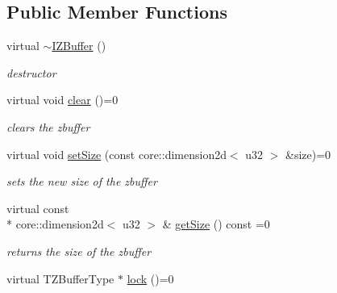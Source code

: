\subsection*{Public Member Functions}
\begin{DoxyCompactItemize}
\item 
\hypertarget{classirr_1_1video_1_1_i_z_buffer_a8fa5691c16e71b7e1fd1babe30f40d32}{virtual \hyperlink{classirr_1_1video_1_1_i_z_buffer_a8fa5691c16e71b7e1fd1babe30f40d32}{$\sim$\-I\-Z\-Buffer} ()}\label{classirr_1_1video_1_1_i_z_buffer_a8fa5691c16e71b7e1fd1babe30f40d32}

\begin{DoxyCompactList}\small\item\em destructor \end{DoxyCompactList}\item 
\hypertarget{classirr_1_1video_1_1_i_z_buffer_a9bba03b0f25ac2cfe065d111cd7d63f2}{virtual void \hyperlink{classirr_1_1video_1_1_i_z_buffer_a9bba03b0f25ac2cfe065d111cd7d63f2}{clear} ()=0}\label{classirr_1_1video_1_1_i_z_buffer_a9bba03b0f25ac2cfe065d111cd7d63f2}

\begin{DoxyCompactList}\small\item\em clears the zbuffer \end{DoxyCompactList}\item 
\hypertarget{classirr_1_1video_1_1_i_z_buffer_abb45884214a4c41fc129f248c2c6371c}{virtual void \hyperlink{classirr_1_1video_1_1_i_z_buffer_abb45884214a4c41fc129f248c2c6371c}{set\-Size} (const core\-::dimension2d$<$ u32 $>$ \&size)=0}\label{classirr_1_1video_1_1_i_z_buffer_abb45884214a4c41fc129f248c2c6371c}

\begin{DoxyCompactList}\small\item\em sets the new size of the zbuffer \end{DoxyCompactList}\item 
\hypertarget{classirr_1_1video_1_1_i_z_buffer_a5ff13425212cefff78c27149f62e9666}{virtual const \\*
core\-::dimension2d$<$ u32 $>$ \& \hyperlink{classirr_1_1video_1_1_i_z_buffer_a5ff13425212cefff78c27149f62e9666}{get\-Size} () const =0}\label{classirr_1_1video_1_1_i_z_buffer_a5ff13425212cefff78c27149f62e9666}

\begin{DoxyCompactList}\small\item\em returns the size of the zbuffer \end{DoxyCompactList}\item 
\hypertarget{classirr_1_1video_1_1_i_z_buffer_a6cdae82b888885ef2bb935e2fa1966d1}{virtual T\-Z\-Buffer\-Type $\ast$ \hyperlink{classirr_1_1video_1_1_i_z_buffer_a6cdae82b888885ef2bb935e2fa1966d1}{lock} ()=0}\label{classirr_1_1video_1_1_i_z_buffer_a6cdae82b888885ef2bb935e2fa1966d1}


\end{DoxyCompactItemize}

